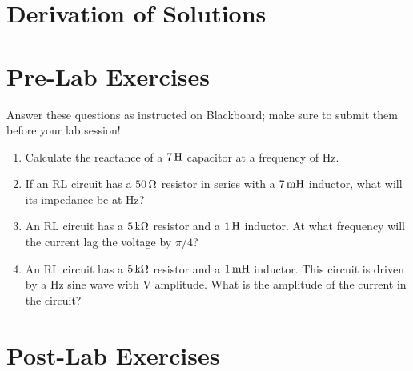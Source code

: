 \documentclass[12pt]{article}
\begin{document}
\appendix

\section{Derivation of Solutions}
\label{sec:solutions}


\newpage

\section*{Pre-Lab Exercises}

Answer these questions as instructed on Blackboard; make sure to
submit them before your lab session!

\begin{enumerate}
\item Calculate the reactance of a $\unit[7]{H}$ capacitor at a
  frequency of \unit[250]{Hz}.
\item If an RL circuit has a $\unit[50]{\Omega}$ resistor in series
  with a $\unit[7]{m H}$ inductor, what will its impedance be at
  \unit[500]{Hz}?
\item An RL circuit has a $\unit[5]{k\Omega}$ resistor and a
  $\unit[1]{H}$ inductor.  At what frequency will the current
  lag the voltage by $\pi/4$?
\item An RL circuit has a $\unit[5]{k\Omega}$ resistor and a
  $\unit[1]{m H}$ inductor.  This circuit is driven by a
  \unit[100]{Hz} sine wave with \unit[1]{V} amplitude.  What is the
  amplitude of the current in the circuit?
\end{enumerate}

\newpage

\section*{Post-Lab Exercises}
\end{document}

